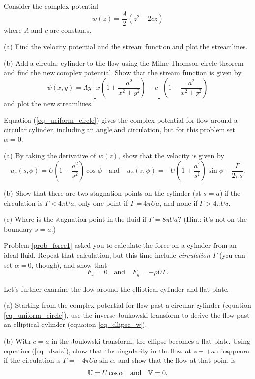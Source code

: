 \begin{problem}
Consider the complex potential
\[
w(z) = \frac{A}{2} (z^2 - 2cz)
\]
where $A$ and $c$ are constants.  

(a) Find the velocity potential and the stream function and plot the streamlines.

(b) Add a circular cylinder to the flow using the Milne-Thomson circle theorem and find the new complex potential.  Show that the stream function is given by
\[
\psi(x, y) = Ay \left[ x \left( 1 + \frac{a^2}{x^2 + y^2} \right) - c\right] \left(1 - \frac{a^2}{x^2 + y^2} \right)
\]
and plot the new streamlines.
\end{problem}

\begin{problem}
\label{prob_circlular_cylinder}
Equation (\ref{eq_uniform_circle}) gives the complex potential for flow around a circular cylinder, including an angle and circulation, but for this problem set $\alpha = 0$.  

(a) By taking the derivative of $w(z)$, show that the velocity is given by
\[
u_s(s, \phi) = U \left( 1 - \frac{a^2}{s^2} \right) \cos \phi \quad \text{and} \quad u_\phi(s, \phi) = -U \left( 1 + \frac{a^2}{s^2} \right) \sin \phi + \frac{\Gamma}{2\pi s}.
\]

(b) Show that there are two stagnation points on the cylinder (at $s = a$) if the circulation is $\Gamma < 4\pi U a$, only one point if $\Gamma = 4\pi U a$, and none if $\Gamma > 4\pi U a$. 

(c) Where is the stagnation point in the fluid if $\Gamma = 8 \pi U a$?  (Hint: it's not on the boundary $s=a$.)
\end{problem}

\begin{problem}
\label{prob_force2}
Problem \ref{prob_force1} asked you to calculate the force on a cylinder from an ideal fluid.  Repeat that calculation, but this time include \emph{circulation} $\Gamma$ (you can set $\alpha = 0$, though), and show that
\[
F_x = 0 \quad \text{and} \quad F_y = -\rho U \Gamma.
\]
\end{problem}

\begin{problem}
\label{prob_flat_plate}
Let's further examine the flow around the elliptical cylinder and flat plate.

(a) Starting from the complex potential for flow past a circular cylinder (equation \ref{eq_uniform_circle}), use the inverse Joukowski transform to derive the flow past an elliptical cylinder (equation \ref{eq_ellipse_w}).

(b) With $c = a$ in the Joulowski transform, the ellipse becomes a flat plate.  Using equation (\ref{eq_dwdz}), show that the singularity in the flow at $z = +a$ disappears if the circulation is $\Gamma = -4\pi U a \sin \alpha$, and show that the flow at that point is
\[
\mathbb{U} = U \cos \alpha \quad \text{and} \quad \mathbb{V} = 0.
\]
\end{problem}

